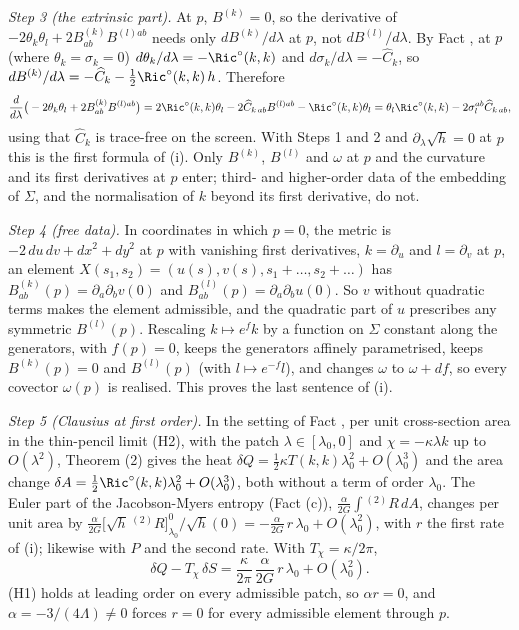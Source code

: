 \emph{Step 3 (the extrinsic part).} At $p$, $B^{(k)} = 0$, so the derivative of $-2\theta_{k}\theta_{l} + 2B^{(k)}_{ab}B^{(l)ab}$ needs only $dB^{(k)}/d\lambda$ at $p$, not $dB^{(l)}/d\lambda$. By Fact , at $p$ (where $\theta_{k} = \sigma_{k} = 0$) $d\theta_{k}/d\lambda = -\Ric^{\circ}(k,k)$ and $d\sigma_{k}/d\lambda = -\widehat{C}_{k}$, so $dB^{(k)}/d\lambda = -\widehat{C}_{k} - \tfrac12\Ric^{\circ}(k,k)\,h$. Therefore
\[
\frac{d}{d\lambda}\big(-2\theta_{k}\theta_{l} + 2B^{(k)}_{ab}B^{(l)ab}\big) = 2\Ric^{\circ}(k,k)\theta_{l} - 2\widehat{C}_{k\,ab}B^{(l)ab} - \Ric^{\circ}(k,k)\theta_{l} = \theta_{l}\Ric^{\circ}(k,k) - 2\sigma_{l}^{ab}\widehat{C}_{k\,ab},
\]
using that $\widehat{C}_{k}$ is trace-free on the screen. With Steps 1 and 2 and $\partial_{\lambda}\sqrt{h} = 0$ at $p$ this is the first formula of (i). Only $B^{(k)}$, $B^{(l)}$ and $\omega$ at $p$ and the curvature and its first derivatives at $p$ enter; third- and higher-order data of the embedding of $\Sigma$, and the normalisation of $k$ beyond its first derivative, do not.

\emph{Step 4 (free data).} In coordinates in which $p = 0$, the metric is $-2\,du\,dv + dx^{2} + dy^{2}$ at $p$ with vanishing first derivatives, $k = \partial_{u}$ and $l = \partial_{v}$ at $p$, an element $X(s_{1},s_{2}) = (u(s), v(s), s_{1} + \dots, s_{2} + \dots)$ has $B^{(k)}_{ab}(p) = \partial_{a}\partial_{b}v(0)$ and $B^{(l)}_{ab}(p) = \partial_{a}\partial_{b}u(0)$. So $v$ without quadratic terms makes the element admissible, and the quadratic part of $u$ prescribes any symmetric $B^{(l)}(p)$. Rescaling $k \mapsto e^{f}k$ by a function on $\Sigma$ constant along the generators, with $f(p) = 0$, keeps the generators affinely parametrised, keeps $B^{(k)}(p) = 0$ and $B^{(l)}(p)$ (with $l \mapsto e^{-f}l$), and changes $\omega$ to $\omega + df$, so every covector $\omega(p)$ is realised. This proves the last sentence of (i).

\emph{Step 5 (Clausius at first order).} In the setting of Fact , per unit cross-section area in the thin-pencil limit (H2), with the patch $\lambda \in [\lambda_{0}, 0]$ and $\chi = -\kappa\lambda k$ up to $O(\lambda^{2})$, Theorem (2) gives the heat $\delta Q = \tfrac12\kappa T(k,k)\lambda_{0}^{2} + O(\lambda_{0}^{3})$ and the area change $\delta A = \tfrac12\Ric^{\circ}(k,k)\lambda_{0}^{2} + O(\lambda_{0}^{3})$, both without a term of order $\lambda_{0}$. The Euler part of the Jacobson-Myers entropy (Fact (c)), $\frac{\alpha}{2G}\int{}^{(2)}\!R\,dA$, changes per unit area by $\frac{\alpha}{2G}\big[\sqrt{h}\,{}^{(2)}\!R\big]_{\lambda_{0}}^{0}/\sqrt{h}(0) = -\frac{\alpha}{2G}\,r\,\lambda_{0} + O(\lambda_{0}^{2})$, with $r$ the first rate of (i); likewise with $P$ and the second rate. With $T_{\chi} = \kappa/2\pi$,
\[
\delta Q - T_{\chi}\,\delta S = \frac{\kappa}{2\pi}\,\frac{\alpha}{2G}\,r\,\lambda_{0} + O(\lambda_{0}^{2}) .
\]
(H1) holds at leading order on every admissible patch, so $\alpha r = 0$, and $\alpha = -3/(4\Lambda) \neq 0$ forces $r = 0$ for every admissible element through $p$.

